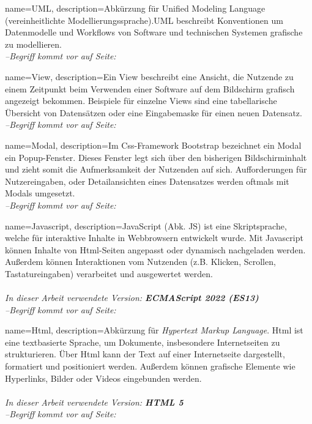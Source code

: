 {
    name=UML,
    description={Abkürzung für Unified Modeling Language (vereinheitlichte Modellierungssprache).UML beschreibt Konventionen um Datenmodelle und Workflows von Software und technischen Systemen grafische zu modellieren.
            ~\cite{UML}}
    \\\textit{--Begriff kommt vor auf Seite: }
}

{
    name=View,
    description={Ein View beschreibt eine Ansicht, die Nutzende zu einem Zeitpunkt beim Verwenden einer Software auf dem Bildschirm grafisch angezeigt bekommen. Beispiele für einzelne Views sind eine tabellarische Übersicht von Datensätzen oder eine Eingabemaske für einen neuen Datensatz.}
    \\\textit{--Begriff kommt vor auf Seite: }
}

{
    name=Modal,
    description={Im \gls{Css}-Framework \gls{Bootstrap} bezeichnet ein Modal ein Popup-Fenster. Dieses Fenster legt sich über den bisherigen Bildschirminhalt und zieht somit die Aufmerksamkeit der Nutzenden auf sich. Aufforderungen für Nutzereingaben, oder Detailansichten eines Datensatzes werden oftmals mit Modals umgesetzt.}
    \\\textit{--Begriff kommt vor auf Seite: }
}

{
    name=Javascript,
    description={JavaScript (Abk. JS) ist eine Skriptsprache, welche für interaktive Inhalte in Webbrowsern entwickelt wurde. Mit Javascript können Inhalte von \gls{Html}-Seiten angepasst oder dynamisch nachgeladen werden. Außerdem können Interaktionen vom Nutzenden (z.B. Klicken, Scrollen, Tastatureingaben) verarbeitet und ausgewertet werden.\\ \\
            \textit{In dieser Arbeit verwendete Version: \textbf{ECMAScript 2022 (ES13)}}
            ~\cite{Javascript}}
    \\\textit{--Begriff kommt vor auf Seite: }
}

{
    name=Html,
    description={Abkürzung für \textit{Hypertext Markup Language}. Html ist eine textbasierte Sprache, um Dokumente, insbesondere Internetseiten zu strukturieren. Über Html kann der Text auf einer Internetseite dargestellt, formatiert und positioniert werden. Außerdem können grafische Elemente wie Hyperlinks, Bilder oder Videos eingebunden werden.\\ \\
            \textit{In dieser Arbeit verwendete Version: \textbf{HTML 5}}
            ~\cite{Html}}
    \\\textit{--Begriff kommt vor auf Seite: }
}

